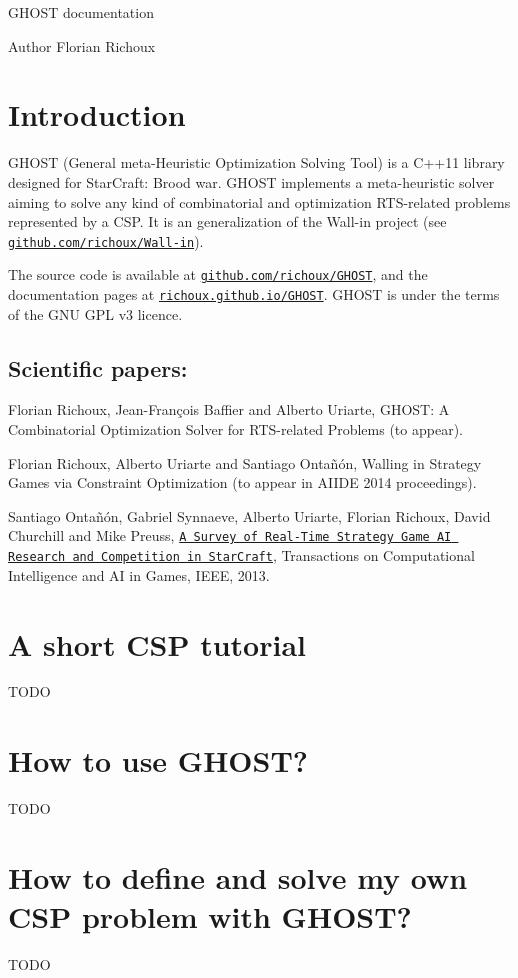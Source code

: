 G\-H\-O\-S\-T documentation \begin{DoxyAuthor}{Author}
Florian Richoux
\end{DoxyAuthor}
\section*{Introduction }

G\-H\-O\-S\-T (General meta-\/\-Heuristic Optimization Solving Tool) is a C++11 library designed for Star\-Craft\-: Brood war. G\-H\-O\-S\-T implements a meta-\/heuristic solver aiming to solve any kind of combinatorial and optimization R\-T\-S-\/related problems represented by a C\-S\-P. It is an generalization of the Wall-\/in project (see \href{https://github.com/richoux/Wall-in}{\tt github.\-com/richoux/\-Wall-\/in}).

The source code is available at \href{https://github.com/richoux/GHOST}{\tt github.\-com/richoux/\-G\-H\-O\-S\-T}, and the documentation pages at \href{http://richoux.github.io/GHOST}{\tt richoux.\-github.\-io/\-G\-H\-O\-S\-T}. G\-H\-O\-S\-T is under the terms of the G\-N\-U G\-P\-L v3 licence.

\subsection*{Scientific papers\-: }


\begin{DoxyItemize}
\item Florian Richoux, Jean-\/\-François Baffier and Alberto Uriarte, G\-H\-O\-S\-T\-: A Combinatorial Optimization Solver for R\-T\-S-\/related Problems (to appear).
\item Florian Richoux, Alberto Uriarte and Santiago Ontañón, Walling in Strategy Games via Constraint Optimization (to appear in A\-I\-I\-D\-E 2014 proceedings).
\item Santiago Ontañón, Gabriel Synnaeve, Alberto Uriarte, Florian Richoux, David Churchill and Mike Preuss, \href{http://pagesperso.lina.univ-nantes.fr/~richoux-f/publications/tciaig13.pdf}{\tt A Survey of Real-\/\-Time Strategy Game A\-I Research and Competition in Star\-Craft}, Transactions on Computational Intelligence and A\-I in Games, I\-E\-E\-E, 2013.
\end{DoxyItemize}

\section*{A short C\-S\-P tutorial }

T\-O\-D\-O

\section*{How to use G\-H\-O\-S\-T? }

T\-O\-D\-O

\section*{How to define and solve my own C\-S\-P problem with G\-H\-O\-S\-T? }

T\-O\-D\-O 